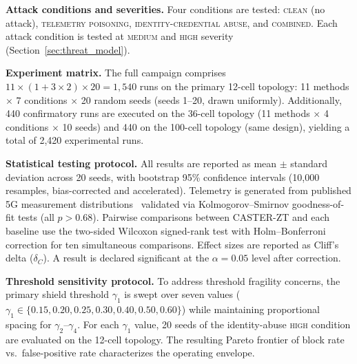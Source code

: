 \documentclass[10pt,journal,compsoc]{IEEEtran}
\begin{document}
\noindent\textbf{Attack conditions and severities.}
Four conditions are tested: \textsc{clean} (no attack), \textsc{telemetry poisoning}, \textsc{identity-credential abuse}, and \textsc{combined}.
Each attack condition is tested at \textsc{medium} and \textsc{high} severity (Section~\ref{sec:threat_model}).

\noindent\textbf{Experiment matrix.}
The full campaign comprises $11 \times (1 + 3 \times 2) \times 20 = 1{,}540$ runs on the primary 12-cell topology: 11 methods $\times$ 7 conditions $\times$ 20 random seeds (seeds 1--20, drawn uniformly).
Additionally, 440 confirmatory runs are executed on the 36-cell topology (11 methods $\times$ 4 conditions $\times$ 10 seeds) and 440 on the 100-cell topology (same design), yielding a total of 2,420 experimental runs.

\noindent\textbf{Statistical testing protocol.}
All results are reported as mean $\pm$ standard deviation across 20 seeds, with bootstrap 95\% confidence intervals (10,000 resamples, bias-corrected and accelerated).
Telemetry is generated from published 5G measurement distributions~\cite{narayanan2021first,xu2020understanding,3gpp_tr38913} validated via Kolmogorov--Smirnov goodness-of-fit tests (all $p > 0.68$).
Pairwise comparisons between CASTER-ZT and each baseline use the two-sided Wilcoxon signed-rank test with Holm--Bonferroni correction for ten simultaneous comparisons.
Effect sizes are reported as Cliff's delta ($\delta_C$).
A result is declared significant at the $\alpha = 0.05$ level after correction.

\noindent\textbf{Threshold sensitivity protocol.}
To address threshold fragility concerns, the primary shield threshold $\gamma_1$ is swept over seven values ($\gamma_1 \in \{0.15, 0.20, 0.25, 0.30, 0.40, 0.50, 0.60\}$) while maintaining proportional spacing for $\gamma_2$--$\gamma_4$.
For each $\gamma_1$ value, 20 seeds of the identity-abuse \textsc{high} condition are evaluated on the 12-cell topology.
The resulting Pareto frontier of block rate vs.\ false-positive rate characterizes the operating envelope.
\end{document}
